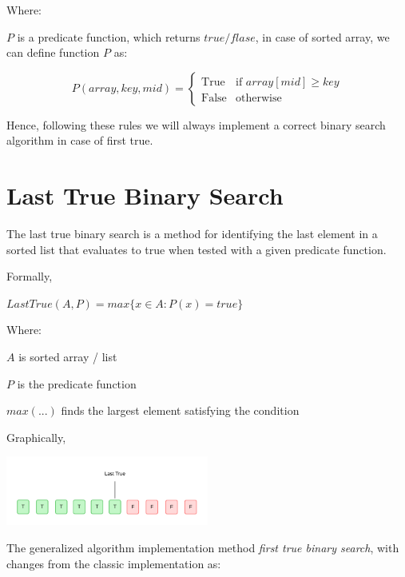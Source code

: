 \documentclass[10pt,twocolumn]{article}
\begin{document}
	\vspace{10pt}
	
	Where:
	
	\quad $P$ is a predicate function, which returns $true / flase$, in case of sorted array, we can define function $P$ as:

\[
P(array, key, mid) = 
\begin{cases} 
	\text{True} & \text{if } array[mid] \ge key \\ 
	\text{False} & \text{otherwise} 
\end{cases}
\]
	\vspace{5pt}
	
	Hence, following these rules we will always implement a correct binary search algorithm in case of first true.  
		 
	\section{Last True Binary Search}
	
		The last true binary search is a method for identifying the last element in a sorted list that evaluates to true when tested with a given predicate function.	
	
	\vspace{10pt}
	
	Formally, 
	
	\vspace*{5pt}
	$LastTrue(A, P) = max\{x \in A: P(x) = true\}$
	\vspace*{5pt}
	
	Where:
	
	\quad$A$ is sorted array / list
	
	\quad$P$ is the predicate function
	
	\quad$max(...)$ finds the largest element satisfying the condition
	
	
	
	\vspace{10pt}
	
	Graphically,
	
	\includegraphics[width=0.5\textwidth]{lasttrue.png}
	
	The generalized algorithm implementation method \emph{first true binary search}, with changes from the classic implementation as:
	
\end{document}
